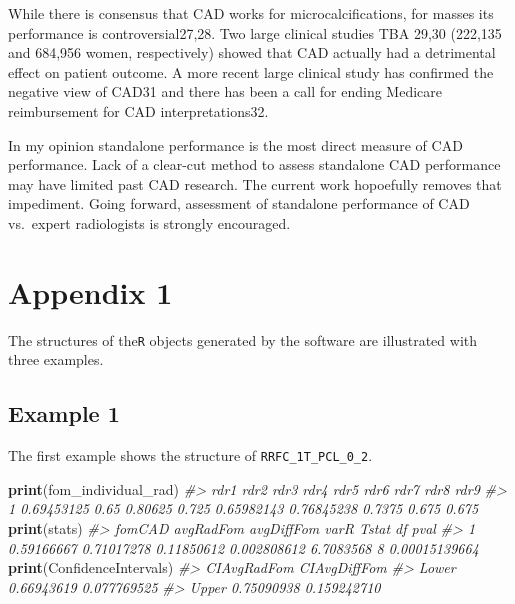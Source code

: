 \documentclass[
]{book}
\newenvironment{Shaded}{\begin{snugshade}}{\end{snugshade}}
\newcommand{\CommentTok}[1]{\textcolor[rgb]{0.56,0.35,0.01}{\textit{#1}}}
\newcommand{\KeywordTok}[1]{\textcolor[rgb]{0.13,0.29,0.53}{\textbf{#1}}}
\newcommand{\NormalTok}[1]{#1}
\begin{document}
While there is consensus that CAD works for microcalcifications, for masses its performance is controversial27,28. Two large clinical studies TBA 29,30 (222,135 and 684,956 women, respectively) showed that CAD actually had a detrimental effect on patient outcome. A more recent large clinical study has confirmed the negative view of CAD31 and there has been a call for ending Medicare reimbursement for CAD interpretations32.

In my opinion standalone performance is the most direct measure of CAD performance. Lack of a clear-cut method to assess standalone CAD performance may have limited past CAD research. The current work hopoefully removes that impediment. Going forward, assessment of standalone performance of CAD vs.~expert radiologists is strongly encouraged.

\hypertarget{standalone-cad-radiologists-appendix1}{%
\section{Appendix 1}\label{standalone-cad-radiologists-appendix1}}

The structures of the\texttt{R} objects generated by the software are illustrated with three examples.

\hypertarget{example-1}{%
\subsection{Example 1}\label{example-1}}

The first example shows the structure of \texttt{RRFC\_1T\_PCL\_0\_2}.

\begin{Shaded}
\begin{Highlighting}[]
\KeywordTok{print}\NormalTok{(fom_individual_rad)}
\CommentTok{#>         rdr1 rdr2    rdr3  rdr4       rdr5       rdr6   rdr7  rdr8  rdr9}
\CommentTok{#> 1 0.69453125 0.65 0.80625 0.725 0.65982143 0.76845238 0.7375 0.675 0.675}
\KeywordTok{print}\NormalTok{(stats)}
\CommentTok{#>       fomCAD  avgRadFom avgDiffFom        varR     Tstat df          pval}
\CommentTok{#> 1 0.59166667 0.71017278 0.11850612 0.002808612 6.7083568  8 0.00015139664}
\KeywordTok{print}\NormalTok{(ConfidenceIntervals)}
\CommentTok{#>       CIAvgRadFom CIAvgDiffFom}
\CommentTok{#> Lower  0.66943619  0.077769525}
\CommentTok{#> Upper  0.75090938  0.159242710}
\end{Highlighting}
\end{Shaded}
\end{document}
